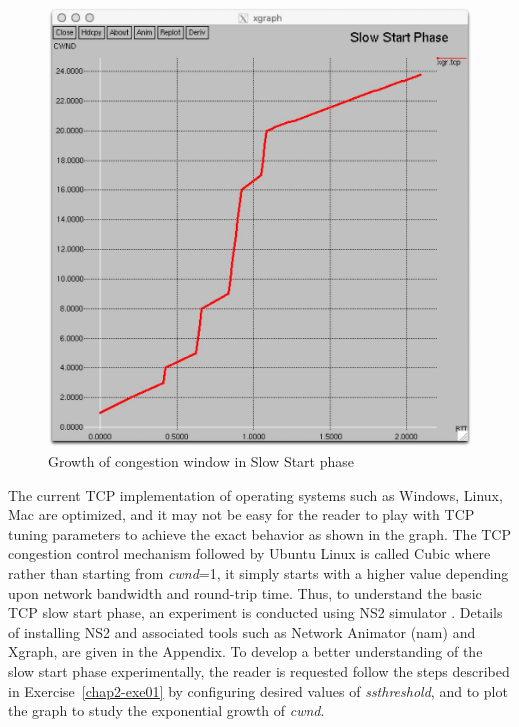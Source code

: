 \begin{multicols}{2}
\begin{figure}[H]
\centering
\includegraphics[scale=.87]{src/Figures/chap2/chap2-fig03.jpg}
\caption{Growth of congestion window in Slow Start phase}\label{chap2-fig03}
\end{figure}

The current TCP implementation of operating systems such as Windows, Linux, Mac are optimized, and it may not be easy for the reader to play with TCP tuning parameters to achieve the exact behavior as shown in the graph. The TCP congestion control mechanism followed by Ubuntu Linux is called Cubic \cite{art2-key08} where rather than starting from \textit{cwnd}=1, it simply starts with a higher value depending upon network bandwidth and round-trip time. Thus, to understand the basic TCP slow start phase, an experiment is conducted using NS2 simulator \cite{art2-key09}. Details of installing NS2 and associated tools such as Network Animator (nam) \cite{art2-key10} and Xgraph\cite{art2-key11}, are given in the Appendix. To develop a better understanding of the slow start phase experimentally, the reader is requested follow the steps described in Exercise~\ref{chap2-exe01} by configuring desired values of \textit{ssthreshold}, and to plot the graph to study the exponential growth of \textit{cwnd}.


\end{multicols}
